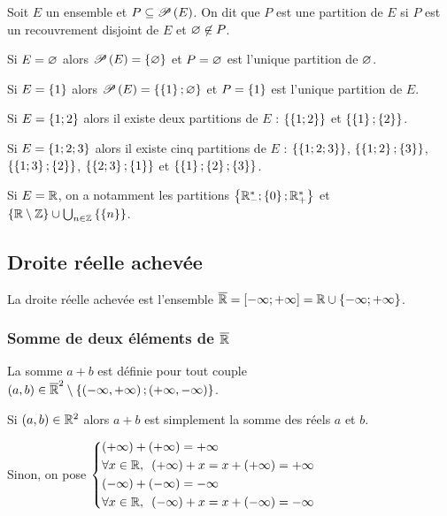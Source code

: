 \begin{defi}
Soit \(E\) un ensemble et \(P\subset\P{E}\). On dit que \(P\) est une partition de \(E\) si \(P\) est un recouvrement disjoint de \(E\) et \(\ensvide\not\in P\).
\end{defi}

\begin{ex}
Si \(E=\ensvide\) alors \(\P{E}=\accol{\ensvide}\) et \(P=\ensvide\) est l'unique partition de \(\ensvide\).

Si \(E=\accol{1}\) alors \(\P{E}=\accol{\accol{1};\ensvide}\) et \(P=\accol{1}\) est l'unique partition de \(E\).

Si \(E=\accol{1;2}\) alors il existe deux partitions de \(E\) : \(\accol{\accol{1;2}}\) et \(\accol{\accol{1};\accol{2}}\).

Si \(E=\accol{1;2;3}\) alors il existe cinq partitions de \(E\) : \(\accol{\accol{1;2;3}}\), \(\accol{\accol{1;2};\accol{3}}\), \(\accol{\accol{1;3};\accol{2}}\), \(\accol{\accol{2;3};\accol{1}}\) et \(\accol{\accol{1};\accol{2};\accol{3}}\).

Si \(E=\R\), on a notamment les partitions \(\accol{\Rms;\accol{0};\Rps}\) et \(\accol{\R\excluant\Z}\union\bigunion_{n\in\Z}\accol{\accol{n}}\).
\end{ex}

\subsection{Droite réelle achevée}

La droite réelle achevée est l'ensemble \(\Rb=\intervii{\minf}{\pinf}=\R\union\accol{\minf;\pinf}\).

\subsubsection{Somme de deux éléments de \(\Rb\)}

La somme \(a+b\) est définie pour tout couple \(\paren{a,b}\in\Rb^2\excluant\accol{\paren{\minf,\pinf};\paren{\pinf,\minf}}\).

Si \(\paren{a,b}\in\R^2\) alors \(a+b\) est simplement la somme des réels \(a\) et \(b\).

Sinon, on pose \(\begin{dcases}
\paren{\pinf}+\paren{\pinf}=\pinf \\
\quantifs{\forall x\in\R}\paren{\pinf}+x=x+\paren{\pinf}=\pinf \\
\paren{\minf}+\paren{\minf}=\minf \\
\quantifs{\forall x\in\R}\paren{\minf}+x=x+\paren{\minf}=\minf
\end{dcases}\)

